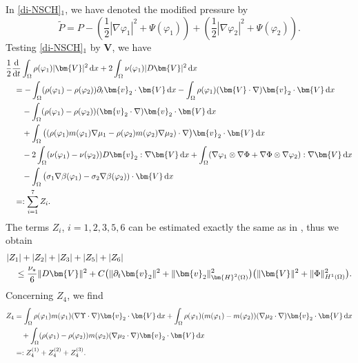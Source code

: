 \documentclass[11pt,reqno]{amsart}
\def\d{{\rm d}}
\def\H{\bm{H}}
\def\vv{\bm{v}}
\begin{document}
%
In \eqref{di-NSCH}$_1$, we have denoted the modified pressure by
$$
\widetilde{P}=P - \left(\frac{1}{2}|\nabla \varphi_1|^2 +\Psi(\varphi_1)\right)+ \left(\frac{1}{2}|\nabla \varphi_2|^2 +\Psi(\varphi_2)\right).
$$
%
Testing \eqref{di-NSCH}$_1$ by $\bm{V}$, we have
%
\begin{align}
& \frac12\frac{\d}{\d t} \int_\Omega \rho(\varphi_1) |\bm{V}|^2\,\d x
+ 2\int_\Omega \nu(\varphi_1)|D \bm{V}|^2\,\d x
\notag\\
&\quad = - \int_\Omega (\rho(\varphi_1)-\rho(\varphi_2))\partial_t\vv_2\cdot \bm{V}\,\d x
- \int_\Omega \rho(\varphi_1)(\bm{V}\cdot\nabla)\vv_2\cdot\bm{V}\,\d x
\notag\\
&\qquad -\int_\Omega (\rho(\varphi_1)-\rho(\varphi_2))(\vv_2\cdot\nabla)\vv_2\cdot\bm{V}\, \d x
\notag\\
&\qquad +\int_\Omega \big((\rho(\varphi_1)m(\varphi_1)\nabla \mu_1-\rho(\varphi_2)m(\varphi_2)\nabla \mu_2)\cdot\nabla\big)\vv_2\cdot \bm{V}\,\d x
\notag \\
&\qquad -2\int_\Omega(\nu(\varphi_1)-\nu(\varphi_2))D\vv_2: \nabla \bm{V}\,\d x
+ \int_\Omega (\nabla \varphi_1\otimes \nabla \Phi+ \nabla \Phi\otimes \nabla \varphi_2):\nabla \bm{V}\, \d x
\notag \\
&\qquad -\int_\Omega \big(  \sigma_1  \nabla \beta(\varphi_1)- \sigma_2  \nabla \beta(\varphi_2)) \cdot \bm{V}\, \d x
\notag\\
&\quad =:\sum_{i=1}^{7}Z_i.
\label{di-NS}
\end{align}
%
The terms $Z_i$, $i=1,2,3,5,6$ can be estimated exactly the same as in \cite[Section 6]{Gior2021}, thus we obtain
%
\begin{align}
& |Z_1|+|Z_2|+|Z_3|+|Z_5|+|Z_6|
\notag\\
&\quad \leq \frac{\nu_*}{6}\|D\bm{V}\|^2 +
C\big(\|\partial_t\vv_2\|^2+ \|\vv_2\|^2_{\H^2(\Omega)}\big)\big(\|\bm{V}\|^2+ \|\Phi\|_{H^1(\Omega)}^2\big).
\notag
\end{align}
%
Concerning $Z_4$, we find
%
\begin{align*}
Z_4&= \int_\Omega \rho(\varphi_1)m(\varphi_1)(\nabla\Upsilon \cdot\nabla)\vv_2\cdot \bm{V}\,\d x
+ \int_\Omega \rho(\varphi_1)(m(\varphi_1)-m(\varphi_2))(\nabla \mu_2\cdot\nabla)\vv_2\cdot\bm{V}\,\d x
\notag\\
&\quad + \int_\Omega (\rho(\varphi_1)-\rho(\varphi_2))m(\varphi_2)(\nabla \mu_2\cdot\nabla)\vv_2\cdot\bm{V}\,\d x
\notag\\
&=: Z_{4}^{(1)}+ Z_{4}^{(2)}+Z_{4}^{(3)}.
\notag
\end{align*}
\end{document}
